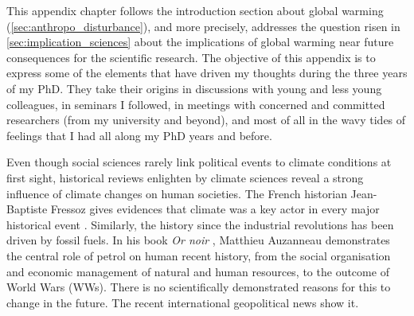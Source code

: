 \newpage
\thispagestyle{empty}
\mbox{}
\newpage

\label{sec:research_futur}
This appendix chapter follows the introduction section about global warming (\cref{sec:anthropo_disturbance}), and more precisely, addresses the question risen in \cref{sec:implication_sciences} about the implications of global warming near future consequences for the scientific research.
The objective of this appendix is to express some of the elements that have driven my thoughts during the three years of my PhD. 
They take their origins in discussions with young and less young colleagues, in seminars I followed, in meetings with concerned and committed researchers (from my university and beyond), and most of all in the wavy tides of feelings that I had all along my PhD years and before.
\vspace{\baselineskip}

Even though social sciences rarely link political events to climate conditions at first sight, historical reviews enlighten by climate sciences reveal a strong influence of climate changes on human societies. The French historian Jean-Baptiste Fressoz gives evidences that climate was a key actor in every major historical event \citep{fressoz_revoltes_2020}.
Similarly, the history since the industrial revolutions has been driven by fossil fuels. In his book \textit{Or noir} \citep{auzanneau_or_2015}, Matthieu Auzanneau demonstrates the central role of petrol on human recent history, from the social organisation and economic management of natural and human resources, to the outcome of World Wars (WWs).
There is no scientifically demonstrated reasons for this to change in the future. The recent international geopolitical news show it.

